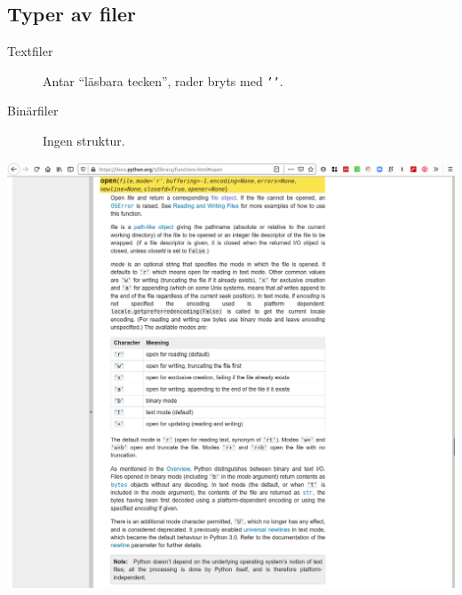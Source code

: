 \begin{frame}[fragile]
  \begin{example}
    \inputminted[firstline=3,lastline=9,firstnumber=3]{python}{examples/read_file.py}
  \end{example}
\end{frame}

\begin{frame}[fragile]
  \begin{example}
    \inputminted[firstline=11,lastline=18,firstnumber=11]{python}{examples/read_file.py}
  \end{example}
\end{frame}

\subsection{Typer av filer}

\begin{frame}
  \begin{remark}
    \begin{description}
      \item[Textfiler] Antar \enquote{läsbara tecken}, rader bryts med 
        \texttt{'\n'}.
      \item[Binärfiler] Ingen struktur.
    \end{description}
  \end{remark}
\end{frame}

\begin{frame}
  \includegraphics[width=\columnwidth]{figs/docs-open.png}
\end{frame}


